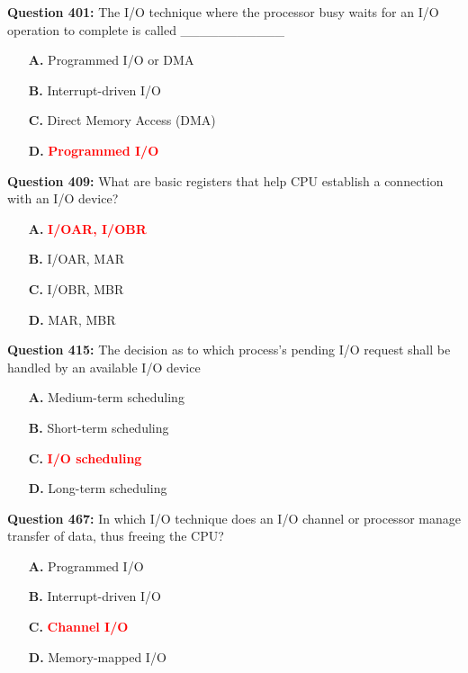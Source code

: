 \documentclass[12pt,a4paper]{article}
\begin{document}
\vspace{0.5cm}

\textbf{Question 401:} The I/O technique where the processor busy waits for an I/O operation to complete is called ___________

\begin{itemize}
    \item[\textbf{A.}] Programmed I/O or DMA
    \item[\textbf{B.}] Interrupt-driven I/O
    \item[\textbf{C.}] Direct Memory Access (DMA)
    \item[\textbf{D.}] \textcolor{red}{\textbf{Programmed I/O}}
\end{itemize}

\vspace{0.5cm}

\textbf{Question 409:} What are basic registers that help CPU establish a connection with an I/O device?

\begin{itemize}
    \item[\textbf{A.}] \textcolor{red}{\textbf{I/OAR, I/OBR}}
    \item[\textbf{B.}] I/OAR, MAR
    \item[\textbf{C.}] I/OBR, MBR
    \item[\textbf{D.}] MAR, MBR
\end{itemize}

\vspace{0.5cm}

\textbf{Question 415:} The decision as to which process's pending I/O request shall be handled by an available I/O device

\begin{itemize}
    \item[\textbf{A.}] Medium-term scheduling
    \item[\textbf{B.}] Short-term scheduling
    \item[\textbf{C.}] \textcolor{red}{\textbf{I/O scheduling}}
    \item[\textbf{D.}] Long-term scheduling
\end{itemize}

\vspace{0.5cm}

\textbf{Question 467:} In which I/O technique does an I/O channel or processor manage transfer of data, thus freeing the CPU?

\begin{itemize}
    \item[\textbf{A.}] Programmed I/O
    \item[\textbf{B.}] Interrupt-driven I/O
    \item[\textbf{C.}] \textcolor{red}{\textbf{Channel I/O}}
    \item[\textbf{D.}] Memory-mapped I/O
\end{itemize}
\end{document}
